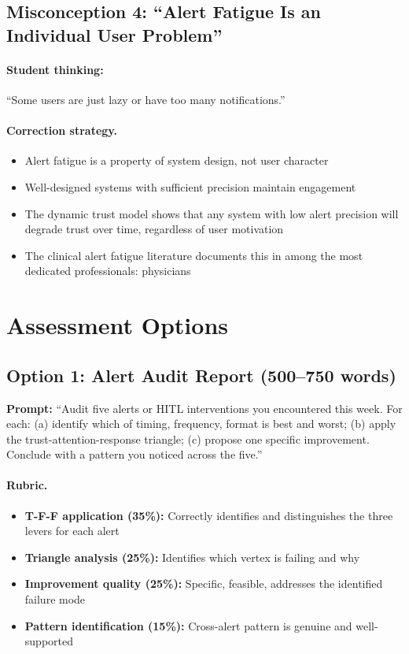 \subsection{Misconception 4: ``Alert Fatigue Is an Individual User Problem''}

\paragraph{Student thinking:} ``Some users are just lazy or have too many notifications.''

\paragraph{Correction strategy.}
\begin{itemize}
    \item Alert fatigue is a property of system design, not user character
    \item Well-designed systems with sufficient precision maintain engagement
    \item The dynamic trust model shows that any system with low alert precision will degrade trust over time, regardless of user motivation
    \item The clinical alert fatigue literature documents this in among the most dedicated professionals: physicians
\end{itemize}

\section{Assessment Options}

\subsection{Option 1: Alert Audit Report (500--750 words)}

\textbf{Prompt:} ``Audit five alerts or HITL interventions you encountered this week. For each: (a) identify which of timing, frequency, format is best and worst; (b) apply the trust-attention-response triangle; (c) propose one specific improvement. Conclude with a pattern you noticed across the five.''

\paragraph{Rubric.}
\begin{itemize}
    \item \textbf{T-F-F application (35\%):} Correctly identifies and distinguishes the three levers for each alert
    \item \textbf{Triangle analysis (25\%):} Identifies which vertex is failing and why
    \item \textbf{Improvement quality (25\%):} Specific, feasible, addresses the identified failure mode
    \item \textbf{Pattern identification (15\%):} Cross-alert pattern is genuine and well-supported
\end{itemize}

